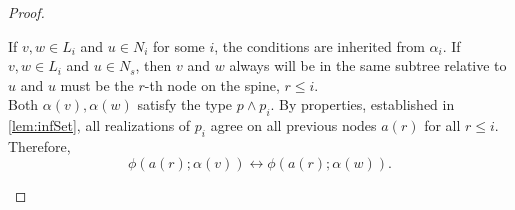 \begin{proof}
\begin{outline}
{}
                \4 If $v,w\in L_i$ and $u\in N_i$ for some $i$, the conditions are inherited from $\alpha_i$.
                \4 If $v,w\in L_i$ and $u\in N_s$, then $v$ and $w$ always will be in the same subtree relative to $u$ and $u$ must be the $r$-th node on the spine, $r \leq i$.\\
                Both $\alpha(v),\alpha(w)$ satisfy the type $p\land p_i$. By properties, established in \cref{lem:infSet}, all realizations of $p_i$ agree on all previous nodes $a(r)$ for all $r\leq i$. Therefore, $$\phi(a(r);\alpha(v))\leftrightarrow\phi(a(r);\alpha(w)).$$
\end{outline}
\end{proof}
